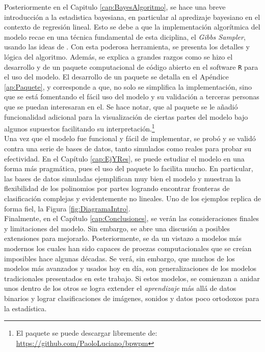 \documentclass[../Main/Main.tex]{subfiles}
\begin{document}
Posteriormente en el Capitulo \ref{cap:BayesAlgoritmo}, se hace una breve introducción a la estadistica bayesiana, en particular al apredizaje bayesiano en el contexto de regresión lineal. Esto se debe a que la implementación algorítmica del modelo recae en una técnica fundamental de esta diciplina, el \textit{Gibbs Sampler}, usando las ideas de \autocite{albert1993bayesian}. Con esta poderosa herramienta, se presenta los detalles y lógica del algoritmo. Además, se explica a grandes razgos como se hizo el desarrollo y de un paquete computacional de código abierto en el software \verb|R| para el uso del modelo. El desarrollo de un paquete se detalla en el Apéndice \ref{ap:Paquete}, y corresponde a que, no solo se simplifica la implementación, sino que se está fomentando el fácil uso del modelo y su validación a terceras personas que se puedan interesaran en el. Se hace notar, que al paquete se le añadió funcionalidad adicional para la visualización de ciertas partes del modelo bajo algunos supuestos facilitando su interpretación.\footnote{El paquete se puede descargar libremente de: \url{https://github.com/PaoloLuciano/bpwpm}}\\

Una vez que el modelo fue funcional y fácil de implementar, se probó y se validó contra una serie de bases de datos, tanto simulados como reales para probar su efectividad. En el Capítulo \ref{cap:EjYRes}, se puede estudiar el modelo en una forma más pragmática, pues el uso del paquete lo facilita mucho. En particular, las bases de datos simuladas ejemplifican muy bien el modelo y muestran la flexibilidad de los polinomios por partes logrando encontrar fronteras de clasificación complejas y evidentemente no lineales. Uno de los ejemplos replica de forma fiel, la Figura \ref{fig:DiagramaIntro}.\\ 

Finalmente, en el Capítulo \ref{cap:Conclusiones}, se verán las consideraciones finales y limitaciones del modelo. Sin embargo, se abre una discusión a posibles extensiones para mejorarlo. Posteriormente, se da un vistazo a modelos más modernos los cuales han sido capaces de proezas computacionales que se creían imposibles hace algunas décadas. Se verá, sin embargo, que muchos de los modelos más avanzados y usados hoy en día, son generalizaciones de los modelos tradicionales presentados en este trabajo. Si estos modelos, se comienzan a anidar unos dentro de los otros se logra extender el \textit{aprendizaje} más allá de datos binarios y lograr clasificaciones de imágenes, sonidos y datos poco ortodoxos para la estadística. 
\end{document}
